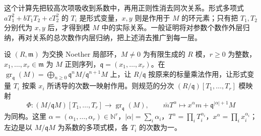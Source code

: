 \ProseParagraphBreak
这个计算先把较高次项吸收到系数中，再用正则性消去同次关系。形式多项式 \(aT_1^2+bT_1T_2+cT_2^2\) 的 \(T_i\) 是形式变量，\(x,y\) 则是作用于 \(M\) 的环元素；只有把 \(T_1,T_2\) 分别代为 \(x,y\) 后，才得到模 \(M\) 中的实际关系。一般证明将对参数个数作外层归纳，再对关系的总次数作内层归纳，把上述消去推广到每一层。

\begin{lemma}[正则序列的伴随分次模]\label{b3:lem:regular-sequence-associated-graded}
	设 \((R,\mathfrak m)\) 为交换 Noether 局部环，\(M\ne0\) 为有限生成的 \(R\) 模，\(r\ge0\) 为整数，\(x_1,\ldots,x_r\in\mathfrak m\) 为 \(M\) 正则序列，\(\mathfrak q=(x_1,\ldots,x_r)\)。在 \(\operatorname{gr}_{\mathfrak q}(M)=\bigoplus_{n\ge0}\mathfrak q^nM/\mathfrak q^{n+1}M\) 上，让 \(R/\mathfrak q\) 按原来的标量乘法作用，让形式变量 \(T_i\) 按乘 \(x_i\) 所诱导的次数一映射作用。则规范的分次 \((R/\mathfrak q)[T_1,\ldots,T_r]\) 模映射
	\[
		\Phi:(M/\mathfrak qM)[T_1,\ldots,T_r] \longrightarrow\operatorname{gr}_{\mathfrak q}(M), \qquad \bar mT^\alpha\longmapsto x^\alpha m+\mathfrak q^{|\alpha|+1}M
	\]
	为同构。这里 \(\alpha=(\alpha_1,\ldots,\alpha_r)\in\mathbb N^r\)，\(|\alpha|=\sum_i\alpha_i\)，\(T^\alpha=\prod_iT_i^{\alpha_i}\)，\(x^\alpha=\prod_i x_i^{\alpha_i}\)；左边是以 \(M/\mathfrak qM\) 为系数的多项式模，各 \(T_i\) 的次数为一。
\end{lemma}
